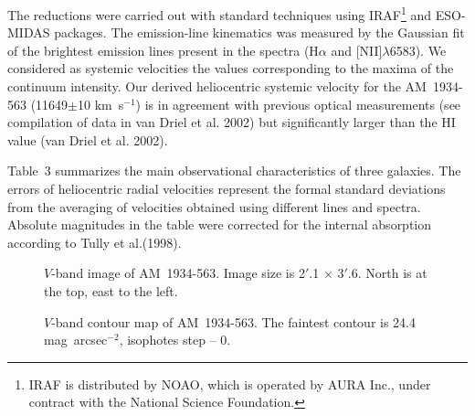 \documentclass[]{aa}
\begin{document}
The reductions were carried out with standard techniques using 
IRAF\footnote{IRAF is distributed by NOAO, which is operated
by AURA Inc., under contract with the National Science Foundation.} 
and ESO-MIDAS packages. The emission-line kinematics was measured
by the Gaussian fit of the brightest emission lines present
in the spectra (H$\alpha$ and [NII]$\lambda$6583). We considered as
systemic velocities the values corresponding to the maxima of the
continuum intensity. Our derived heliocentric systemic velocity
for the AM~1934-563 (11649$\pm$10 km~s$^{-1}$) is in agreement with
previous optical measurements (see compilation of data in
van Driel et al. 2002) but significantly larger than the HI
value (van Driel et al. 2002). 

Table~3 summarizes the main observational characteristics of
three galaxies. The errors of heliocentric radial velocities
represent the formal standard deviations from the averaging
of velocities obtained using different lines and spectra.
Absolute magnitudes in the table were corrected for the internal 
absorption according to Tully et al.(1998).  

\begin{figure}
\centerline{}
\caption{$V$-band image of AM~1934-563. Image size is 2$'$.1 $\times$ 3$'$.6.
North is at the top, east to the left.}
\end{figure}

\begin{figure}
\centerline{}
\caption{$V$-band contour map of AM~1934-563. The faintest contour
is 24.4 mag~arcsec$^{-2}$, isophotes step -- 0.}
\end{figure}
\end{document}
